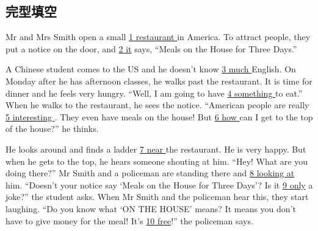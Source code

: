 \subsection{完型填空}
\item{
    Mr and Mrs Smith open a small \underline{ 1 restaurant } in America. To attract people, they put a notice on the door, and \underline{ 2 it} says, ``Meals on the House for Three Days.''

    \hspace{2em} 
    A Chinese student comes to the US and he doesn't know \underline{ 3 much } English. On Monday after he has afternoon classes, he walks past the restaurant. It is time for dinner and he feels very hungry. ``Well, I am going to have \underline{ 4 something } to eat.'' When he walks to the restaurant, he sees the notice. ``American people are really \underline{ 5 interesting }. They even have meals on the house! But \underline{ 6 how } can I get to the top of the house?'' he thinks.

    \hspace{2em} 
    He looks around and finds a ladder \underline{ 7 near } the restaurant. He is very happy. But when he gets to the top, he hears someone shouting at him. ``Hey! What are you doing there?'' Mr Smith and a policeman are standing there and \underline{ 8 looking at } him. ``Doesn't your notice say `Meals on the House for Three Days'? Is it \underline{ 9 only} a joke?'' the student asks. When Mr Smith and the policeman hear this, they start laughing. ``Do you know what `ON THE HOUSE' means? It means you don't have to give money for the meal! It's \underline{ 10 free}!'' the policeman says.

}
